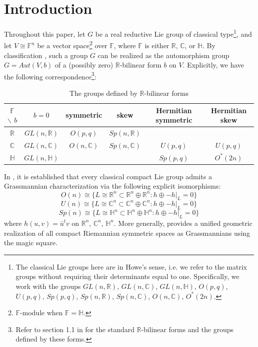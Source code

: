 \documentclass{article}
\begin{document}
\section{Introduction}
Throughout this paper, let $G$ be a real reductive Lie group of classical type\footnote{The classical Lie groups here are in Howe's sense, i.e. we refer to the matrix groups  without requiring their
determinants equal to one. Specifically, we work with the groups $GL(n, \mathbb{R})$, $GL(n, \mathbb{C})$, $GL(n, \mathbb{H})$, $O(p,q)$, $U(p,q)$, $Sp(p,q)$,
$Sp(n,\mathbb{R})$, $Sp(n,\mathbb{C})$, $O(n,\mathbb{C})$, $O^{*}(2n)$.}, and let $V \cong \mathbb{F}^n$ be a vector space\footnote{$\mathbb{F}$-module when $\mathbb{F}=\mathbb{H}$.} over $\mathbb{F}$, where $\mathbb{F}$ is either $\mathbb{R}$, $\mathbb{C}$, or $\mathbb{H}$.
By classification \cite{Har}\cite{K}, such a group $G$  can be realized as the automorphism group $G=Aut(V,b)$ of a (possibly zero) $\mathbb{R}$-bilinear form $b$  on $V$. Explicitly, we have the following correspondence\footnote{Refer to section 1.1 in \cite{Har} for the standard $\mathbb{R}$-bilinear forms and the groups defined by these forms.}:
\vspace{-8pt}
\begin{table}[htbp]
\centering
\caption{The groups defined by $\mathbb{R}$-bilinear forms}
\begin{tabular}{|c|c|c|c|c|c|}
  \hline
  $\mathbb{F}$ $\backslash$ $b$    & $b=0$ & \small{symmetric}  & \small{skew}  & \small{Hermitian  symmetric} & \small{Hermitian skew}  \\  \hline
  $\mathbb{R}$  & $GL(n, \mathbb{R})$ & $O(p,q)$ & $Sp(n,\mathbb{R})$ &  &  \\  \hline
  $\mathbb{C}$ & $GL(n, \mathbb{C})$ &  $O(n,\mathbb{C})$ & $Sp(n,\mathbb{C})$ & $U(p,q)$ & $U(p,q)$ \\ \hline
  $\mathbb{H}$ & $GL(n, \mathbb{H})$  &  &  & $Sp(p,q)$ & $O^{*}(2n)$ \\ \hline
\end{tabular}
\end{table}

In \cite{HL},  it is established that every classical compact Lie group admits a Grassmannian characterization via the following explicit isomorphisms:
\[
O(n) \cong \{L \cong \mathbb{R}^n \subset \mathbb{R}^{n}\oplus \mathbb{R}^{n}: h\oplus-h|_{L}=0\}
\]
\[
U(n) \cong \{L \cong \mathbb{C}^n \subset \mathbb{C}^{n}\oplus \mathbb{C}^{n}: h\oplus-h|_{L}=0\}
\]
\[
Sp(n) \cong \{L \cong \mathbb{H}^n \subset \mathbb{H}^{n}\oplus \mathbb{H}^{n}: h\oplus-h|_{L}=0\}
\]
where $h(u,v)=\bar{u}^tv$ on $\mathbb{R}^{n}$, $\mathbb{C}^{n}$, $\mathbb{H}^{n}$.
More generally, \cite{HL} provides a unified geometric realization of all compact Riemannian symmetric spaces as Grassmannians using the magic square.
\end{document}
